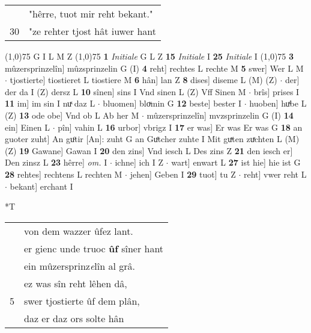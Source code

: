 \documentclass[8pt,a4paper,notitlepage]{article}
\begin{document}
\begin{table}[ht]
\begin{minipage}[t]{0.5\linewidth}
\begin{tabular}{rl}
 & "hêrre, tuot mir reht bekant."\\ 
30 & "ze rehter tjost hât iuwer hant\\ 
\end{tabular}
\scriptsize
\line(1,0){75} \newline
G I L M Z \newline
\line(1,0){75} \newline
\textbf{1} \textit{Initiale} G L Z  \textbf{15} \textit{Initiale} I  \textbf{25} \textit{Initiale} I  \newline
\line(1,0){75} \newline
\textbf{3} mûzersprinzelîn] mûzsprinzelin G (I) \textbf{4} reht] rechtes L rechte M \textbf{5} swer] Wer L M  $\cdot$ tjostierte] tiostieret L tiostiere M \textbf{6} hân] lan Z \textbf{8} dises] diseme L (M) (Z)  $\cdot$ der] der da I (Z) dersz L \textbf{10} sînen] sins I Vnd sinen L (Z) Vff Sinen M  $\cdot$ brîs] prises I \textbf{11} im] im sin I nuͯ daz L  $\cdot$ bluomen] bloͮmin G \textbf{12} beste] bester I  $\cdot$ huoben] huͯbe L (Z) \textbf{13} ode obe] Vnd ob L Ab her M  $\cdot$ mûzersprinzelîn] mvzsprinzelin G (I) \textbf{14} ein] Einen L  $\cdot$ pîn] vahin L \textbf{16} urbor] vbrigz I \textbf{17} er was] Er was Er was G \textbf{18} an guoter zuht] An guͦtir [An]: zuht G an Guͤtcher zuhte I Mit guͯten zuͯchten L (M) (Z) \textbf{19} Gawane] Gawan I \textbf{20} den zins] Vnd iesch L Des zins Z \textbf{21} den iesch er] Den zinsz L \textbf{23} hêrre] \textit{om.} I  $\cdot$ ichne] ich I Z  $\cdot$ wart] enwart L \textbf{27} ist hie] hie ist G \textbf{28} rehtes] rechtens L rechten M  $\cdot$ jehen] Geben I \textbf{29} tuot] tu Z  $\cdot$ reht] vwer reht L  $\cdot$ bekant] erchant I \newline
\end{minipage}
\hspace{0.5cm}
\begin{minipage}[t]{0.5\linewidth}
\small
\begin{center}*T
\end{center}
\begin{tabular}{rl}
 & von dem wazzer ûfez lant.\\ 
 & er gienc unde truoc \textbf{ûf} sîner hant\\ 
 & ein mûzersprinz\textit{e}lîn al grâ.\\ 
 & ez was sîn reht lêhen dâ,\\ 
5 & swer tjostierte ûf dem plân,\\ 
 & daz er daz ors solte hân\\ 

\end{tabular}
\end{minipage}
\end{table}
\end{document}
